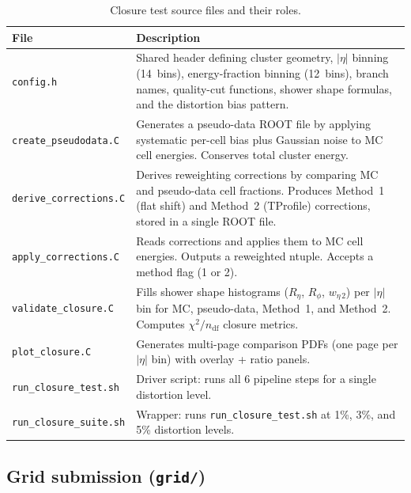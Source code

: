 \documentclass[12pt,a4paper]{article}
\begin{document}
\begin{table}[htbp]
\centering
\caption{Closure test source files and their roles.}
\label{tab:scripts:closure}
\small
\begin{tabular}{lp{9cm}}
\toprule
\textbf{File} & \textbf{Description} \\
\midrule
\texttt{config.h}
  & Shared header defining cluster geometry, $|\eta|$ binning (14~bins),
    energy-fraction binning (12~bins), branch names, quality-cut
    functions, shower shape formulas, and the distortion bias pattern. \\
\texttt{create\_pseudodata.C}
  & Generates a pseudo-data ROOT file by applying systematic per-cell
    bias plus Gaussian noise to MC cell energies. Conserves total
    cluster energy. \\
\texttt{derive\_corrections.C}
  & Derives reweighting corrections by comparing MC and pseudo-data cell
    fractions. Produces Method~1 (flat shift) and Method~2 (TProfile)
    corrections, stored in a single ROOT file. \\
\texttt{apply\_corrections.C}
  & Reads corrections and applies them to MC cell energies. Outputs a
    reweighted ntuple. Accepts a method flag (1 or 2). \\
\texttt{validate\_closure.C}
  & Fills shower shape histograms ($R_\eta$, $R_\phi$, $w_{\eta\,2}$)
    per $|\eta|$ bin for MC, pseudo-data, Method~1, and Method~2.
    Computes $\chi^2/n_\text{df}$ closure metrics. \\
\texttt{plot\_closure.C}
  & Generates multi-page comparison PDFs (one page per $|\eta|$ bin)
    with overlay + ratio panels. \\
\texttt{run\_closure\_test.sh}
  & Driver script: runs all 6 pipeline steps for a single distortion
    level. \\
\texttt{run\_closure\_suite.sh}
  & Wrapper: runs \texttt{run\_closure\_test.sh} at 1\%, 3\%, and 5\%
    distortion levels. \\
\bottomrule
\end{tabular}
\end{table}

\subsection{Grid submission (\texttt{grid/})}
\end{document}
